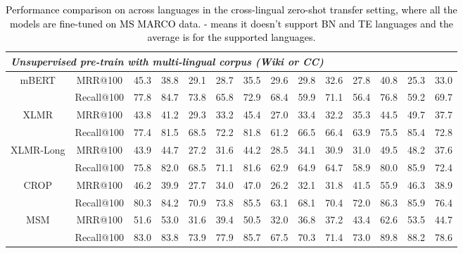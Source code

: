 \begin{table*}[t]
{\begin{tabular}{c|cccccccccccc|c}
\multicolumn{14}{l}{\emph{Unsupervised pre-train with multi-lingual corpus (Wiki or CC)}} \\ \midrule
\multirow{2}{*}{mBERT}  & MRR@100 & 45.3 & 38.8 & 29.1 & 28.7 & 35.5 & 29.6 & 29.8 & 32.6 & 27.8 & 40.8 & 25.3 & 33.0 \\
& Recall@100 & 77.8 & 84.7 & 73.8 & 65.8 & 72.9 & 68.4 & 59.9 & 71.1 & 56.4 & 76.8 & 59.2 & 69.7 \\  \midrule
\multirow{2}{*}{XLMR} & MRR@100 & 43.8 & 41.2 & 29.3 & 33.2 & 45.4 & 27.0 & 33.4 & 32.2 & 35.3 & 44.5 & 49.7 & 37.7 \\ 
  & Recall@100 & 77.4 & 81.5 & 68.5 & 72.2 & 81.8 & 61.2 & 66.5 & 66.4 & 63.9 & 75.5 & 85.4 & 72.8 \\ \midrule
\multirow{2}{*}{XLMR-Long} & MRR@100 & 43.9 & 44.7 & 27.2 & 31.6 & 44.2 & 28.5 & 34.1 & 30.9 & 31.0 & 49.5 & 48.2 & 37.6 \\
 & Recall@100 & 75.8 & 82.0 & 68.5 & 71.1 & 81.6 & 62.9 & 64.9 & 64.7 & 58.9 & 80.0 & 85.9 & 72.4 \\ \midrule
\multirow{2}{*}{CROP} & MRR@100 & 46.2 & 39.9 & 27.7 & 34.0 & 47.0 & 26.2 & 32.1 & 31.8 & 41.5 & 55.9 & 46.3 & 38.9 \\
 & Recall@100 & 80.3 & 84.2 & 70.9 & 73.8 & 85.5 & 63.1 & 68.1 & 70.4 & 72.0 & 86.3 & 85.9 & 76.4 \\
  \midrule
 \multirow{2}{*}{MSM} &  MRR@100 & 51.6 & 53.0 & 31.6 & 39.4 & 50.5 & 32.0 & 36.8 & 37.2 & 43.4 & 62.6 & 53.5 & 44.7  \\
  & Recall@100 & 83.0 & 83.8 & 73.9 & 77.9 & 85.7 & 67.5 & 70.3 & 71.4 & 73.0 & 89.8 & 88.2 & 78.6 \\
 \bottomrule
\end{tabular}
}
\caption{\textcolor{black}{Performance comparison on \tydi across languages in the cross-lingual zero-shot transfer setting, where all the models are fine-tuned on MS MARCO data. - means it doesn't support BN and TE languages and the average is for the supported languages.}}
\label{tab:mrtydi}
\end{table*}





